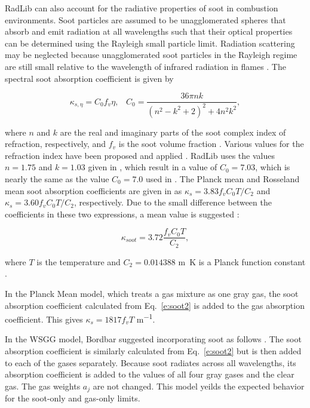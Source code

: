 \documentclass[preprint,12pt, a4paper]{elsarticle}
\begin{document}
RadLib can also account for the radiative properties of soot in combustion environments. Soot particles are assumed to be unagglomerated spheres that absorb and emit radiation at all wavelengths such that their optical properties can be determined using the Rayleigh small particle limit. Radiation scattering may be neglected because unagglomerated soot particles in the Rayleigh regime are still small relative to the wavelength of infrared radiation in flames \cite{Brewster_1992,Solovjov_2001}. The spectral soot absorption coefficient is given by 
%
\begin{linenomath}
\begin{equation}
\label{e:soot1}
	\kappa_{s,\eta}=C_0 f_v \eta, \; \; \; C_0 = \frac{36\pi n k}{(n^2-k^2+2)^2+4n^2k^2},
\end{equation}
\end{linenomath}
%
where $n$ and $k$ are the real and imaginary parts of the soot complex index of refraction, respectively, and $f_v$ is the soot volume fraction \cite{Solovjov_2001,Modest_2013}. Various values for the refraction index have been proposed and applied \cite{Lee_1981,Stull_1960,Dalzell_1969,Howarth_1966,Chang_1990,Felske_1984,Williams_2007}. 
RadLib uses the values $n=1.75$ and $k=1.03$ given in \cite{Williams_2007}, which result in a value of $C_0=7.03$, which is nearly the same as the value $C_0=7.0$ used in \cite{Solovjov_2001}. 
The Planck mean and Rosseland mean soot absorption coefficients are given in \cite{Modest_2013} as $\kappa_s=3.83f_vC_0T/C_2$ and $\kappa_s=3.60f_vC_0T/C_2$, respectively.
Due to the small difference between the coefficients in these two expressions, a mean value is suggested \cite{Felske_1977,Modest_2013}:
%
\begin{linenomath}
\begin{equation}
\label{e:soot2}
	\kappa_{soot}=3.72\frac{f_vC_0T}{C_2},
\end{equation}
\end{linenomath}
%
where $T$ is the temperature and $C_2=0.014388$ \si{m.K} is a Planck function constant \cite{Modest_2013}. 

In the Planck Mean model, which treats a gas mixture as one gray gas, the soot absorption coefficient calculated from Eq.~\ref{e:soot2} is added to the gas absorption coefficient. This gives $\kappa_s=1817f_vT$ \si{m^{-1}}.
 
In the WSGG model, Bordbar suggested incorporating soot as follows \cite{Bordbar_personal}. The soot absorption coefficient is similarly calculated from Eq.~\ref{e:soot2} but is then added to each of the gases separately. Because soot radiates across all wavelengths, its absorption coefficient is added to the values of all four gray gases and the clear gas. The gas weights $a_j$ are not changed. This model yeilds the expected behavior for the soot-only and gas-only limits.
\end{document}
